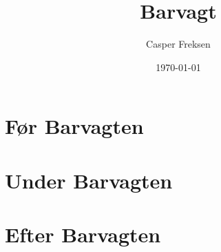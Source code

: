 

\title{Barvagt}
\date{\today}
\author{Casper Freksen}



\maketitle

\section{Før Barvagten}
\label{sec:pre-barvagten}


\section{Under Barvagten}
\label{sec:intra-barvagten}


\section{Efter Barvagten}
\label{sec:post-barvagten}




